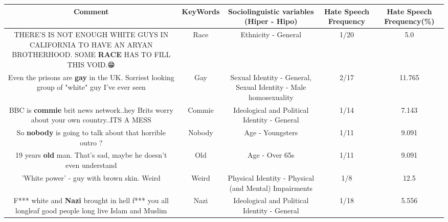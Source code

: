 \documentclass[11pt]{article}
\newlength\mylength
\begin{document}
\begin{center}
\setlength\mylength{\dimexpr\textwidth - 1\arrayrulewidth - 50\tabcolsep}
\begin{longtable}{|C{.65\mylength}|C{.30\mylength}|C{.12\mylength}|C{.12\mylength}|C{.12\mylength}|}
\hline
\textbf{Comment} & \textbf{KeyWords} & \textbf{Sociolinguistic variables (Hiper - Hipo)}  & \textbf{Hate Speech Frequency} & \textbf{Hate Speech Frequency(\%)} \\
\hline{}\small THERE'S IS NOT ENOUGH WHITE GUYS IN CALIFORNIA TO HAVE AN ARYAN BROTHERHOOD. SOME \textbf{RACE} HAS TO FILL THIS VOID.😁\normalsize   & Race & Ethnicity - General & 1/20 & 5.0 \\  \hline
  \small Even the prisons are \textbf{g\textbf{ay}} in the UK. Sorriest looking group of "white" guy I've ever seen\normalsize   & Gay & Sexual Identity - General, Sexual Identity - Male homosexuality & 2/17 & 11.765 \\  \hline
  \small BBC is \textbf{commie} brit news network..hey Brits worry about your own country..ITS A MESS\normalsize   & Commie &  Ideological and Political Identity - General & 1/14 & 7.143 \\  \hline
  \small So \textbf{nobody} is going to talk about that horrible outro ?\normalsize   & Nobody & Age - Youngsters & 1/11 & 9.091 \\  \hline
  \small 19 years \textbf{old} man. That's sad, maybe he doesn't even understand\normalsize   & Old & Age - Over 65s & 1/11 & 9.091 \\  \hline
  \small 'White power' - guy with brown skin. Weird\normalsize   & Weird & Physical Identity - Physical (and Mental) Impairments & 1/8 & 12.5 \\  \hline
  \small F*** white and \textbf{Nazi} brought in hell f*** you all longleaf good people long live Islam and Muslim\normalsize   & Nazi &  Ideological and Political Identity - General & 1/18 & 5.556 \\  \hline

\end{longtable}
\end{center}
\end{document}
